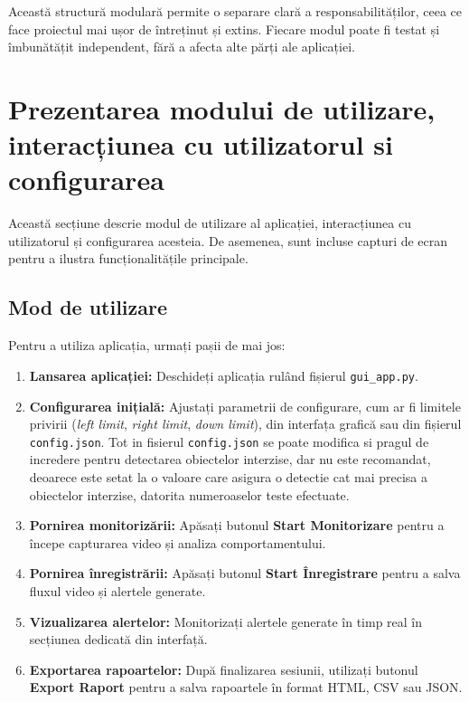 \documentclass[12pt,a4paper]{article}
\begin{document}
Această structură modulară permite o separare clară a responsabilităților, ceea ce face proiectul mai ușor de întreținut și extins. Fiecare modul poate fi testat și îmbunătățit independent, fără a afecta alte părți ale aplicației.

\section{Prezentarea modului de utilizare, interacțiunea cu utilizatorul si configurarea}

Această secțiune descrie modul de utilizare al aplicației, interacțiunea cu utilizatorul și configurarea acesteia. De asemenea, sunt incluse capturi de ecran pentru a ilustra funcționalitățile principale.

\subsection{Mod de utilizare}

Pentru a utiliza aplicația, urmați pașii de mai jos:
\begin{enumerate}
    \item \textbf{Lansarea aplicației:} Deschideți aplicația rulând fișierul \texttt{gui\_app.py}.
    \item \textbf{Configurarea inițială:} Ajustați parametrii de configurare, cum ar fi limitele privirii (\textit{left limit}, \textit{right limit}, \textit{down limit}), din interfața grafică sau din fișierul \texttt{config.json}. Tot in fisierul \texttt{config.json} se poate modifica si pragul de incredere pentru detectarea obiectelor interzise, dar nu este recomandat, deoarece este setat la o valoare care asigura o detectie cat mai precisa a obiectelor interzise, datorita numeroaselor teste efectuate.
    \item \textbf{Pornirea monitorizării:} Apăsați butonul \textbf{Start Monitorizare} pentru a începe capturarea video și analiza comportamentului.
    \item \textbf{Pornirea înregistrării:} Apăsați butonul \textbf{Start Înregistrare} pentru a salva fluxul video și alertele generate.
    \item \textbf{Vizualizarea alertelor:} Monitorizați alertele generate în timp real în secțiunea dedicată din interfață.
    \item \textbf{Exportarea rapoartelor:} După finalizarea sesiunii, utilizați butonul \textbf{Export Raport} pentru a salva rapoartele în format HTML, CSV sau JSON.
\end{enumerate}
\end{document}
